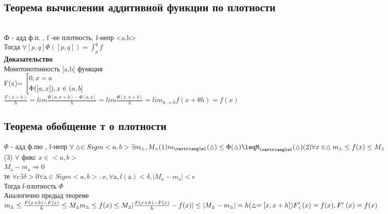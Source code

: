 \documentclass[12pt, a4paper]{article}
\newcommand{\nl}{\newline}
\begin{document}
     
     \subsection{Теорема вычислении аддитивной функции по  плотности} \\ 
     Ф - адд ф.п. , f -ее плотность, f-непр <a,b>\\
     Тогда  $\forall [p,q] \Phi([p,q])=\int_{p}^{q} f$ \\
     
     \textbf{Доказательство} \\
     Монотонотонность [a,b] функция \\
     F(x)=
     $\left[
     \begin{gathered} 
        0,x=a\hfill 
         \\
        \Phi([a,x]),x \in (a,b]\hfill 
         \\
      \end{gathered} 
    \right.$ \\

$\frac{F(x+h)}{h} = lim\frac{\Phi[a,x+h]-\Phi[a,x]}{h}= lim \frac{\Phi[x,x+h]}{h}=lim_{h\rightarrow 0}f(x+\theta h )=f(x)$ \\

 \subsection{Теорема обобщение т о плотности} 
    $\Phi$ - адд ф.пю , f-непр
   	$ \forall \vartriangle \in Sigm<a,b> \exists m_\vartriangle ,M_\vartriangle \\
    (1)
    m_\vartrianglel(\vartriangle) \leq \Phi(\vartriangle)\leqM_\vartrianglel(\vartriangle)\\
    (2) \forall x \in \vartriangle m_\vartriangle \leq f(x) \leq  M_\vartriangle$\\
    (3) $\forall$ фикс $x \in <a,b>$\\
    $M_\vartriangle-m_\vartriangle \Rightarrow 0$ \\
    те $\forall \epsilon  \exists \delta > 0  \forall \vartriangle \in Sigm<a,b>: x,  \forall \vartriangle, l(\vartriangle) < \delta  ,          |M_\vartriangle - m_\vartriangle|<\epsilon$ \\
     Тогда f-плотность $\Phi$ \\
     \nl
 Аналогично предыд теореме \\
    $m_\vartriangle \leq \frac{F(x+h)-F(x)}{h} \leq M_\vartriangle \\
    m_\vartriangle \leq f(x)\leq M_\vartriangle
    |\frac{F(x+h)-F(x)}{h}-f(x)|\leq |M_\vartriangle-m_\vartriangle| = h (\vartriangle =[x,x+h]) \\
    F_+'(x)=f(x) , F_-'(x)=f(x)$ \\
    
\end{document}

